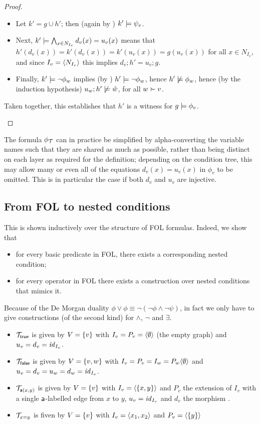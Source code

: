 \begin{proof}
\begin{description}
\begin{itemize}
\item Let $k'=g\cup h'$; then (again by ) $k'\models \psi_v$.

\item Next, $k'\models \bigwedge_{x\in N_{I_v}} d_v(x)=u_v(x)$ means that $h'(d_v(x))=k'(d_v(x))=k'(u_v(x))=g(u_v(x))$ for all $x\in N_{I_v}$, and since $I_v=\langle N_{I_v}\rangle$ this implies $d_v;h'=u_v;g$.

\item Finally, $k'\models \neg\phi_w$ implies (by ) $h'\models\neg\phi_w$, hence $h'\not\models\phi_w$, hence (by the induction hypothesis) $u_w;h'\not\models \hat w$, for all $w\childof v$.
\end{itemize}

Taken together, this establishes that $h'$ is a witness for  $g\models \phi_v$.
\end{description}
\end{proof}
%
The formula $\phi_{\mathcal{T}}$ can in practice be simplified by alpha-converting the variable names such that they are shared as much as possible, rather than being distinct on each layer as required for the definition; depending on the condition tree, this may allow many or even all of the equations $d_v(x)=u_v(x)$ in $\phi_v$ to be omitted. This is in particular the case if both $d_v$ and $u_v$ are injective.

\subsection{From FOL to nested conditions}

This is shown inductively over the structure of FOL formulas. Indeed, we show that
\begin{itemize}
\item for every basic predicate in FOL, there exists a corresponding nested condition;
\item for every operator in FOL there exists a construction over nested conditions that mimics it.
\end{itemize}
%
Because of the De Morgan duality $\phi\vee \phi\equiv \neg(\neg\phi\wedge \neg\psi)$, in fact we only have to give constructions (of the second kind) for $\wedge$, $\neg$ and $\exists$.

\begin{itemize}
\item ${\mathcal{T}}_{\mathsf{true}}$ is given by $V=\{{v}\}$ with $I_v=P_v=\langle \emptyset\rangle$ (the empty graph) and $u_v=d_v={\mathit{id}}_{I_v}$.
\item ${\mathcal{T}}_{\mathsf{false}}$ is given by $V=\{{v,w}\}$ with $I_v=P_v=I_w=P_w\langle \emptyset\rangle$ and $u_v=d_v=u_w=d_w={\mathit{id}}_{I_v}$.
\item ${\mathcal{T}}_{\mathsf{a}(x,y)}$ is given by $V=\{{v}\}$ with $I_v=\langle \{{x,y}\}\rangle$ and $P_v$ the extension of $I_v$ with a single $\mathsf{a}$-labelled edge from $x$ to $y$, $u_v={\mathit{id}}_{I_v}$ and $d_v$ the morphism .
\item ${\mathcal{T}}_{x=y}$ is fiven by $V=\{{v}\}$ with $I_v=\langle x_1,x_2\rangle$ and $P_v=\langle \{{y}\}\rangle$ 
\end{itemize}

